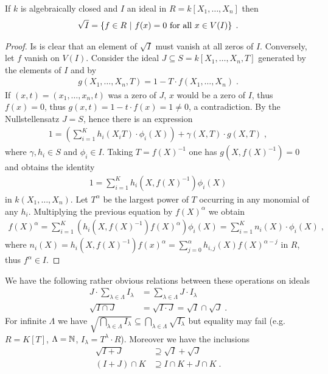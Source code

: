 \documentclass[a4paper,parskip=half,numbers=enddot, DIV=12]{scrreprt}
\begin{document}
	\begin{prop}
		If $k$ is algebraically closed and $I$ an ideal in $R=k[X_1,\ldots,X_n]$ then 
		\begin{align*}
			\sqrt{I} = \left\{f\in R\ \middle|\  f(x) = 0 \text{ for all } x\in V(I)\right\}\;.
		\end{align*}
	\end{prop}
	\begin{proof}
		Is is clear that an element of $\sqrt{I}$ must vanish at all zeros of $I$. Conversely, let $f$ vanish on $V(I)$. Consider the ideal $J\subseteq S = k[X_1,\ldots, X_n, T]$ generated by the elements of $I$ and by 
		\begin{align*}
		g(X_1,\ldots, X_n, T) = 1-T\cdot f(X_1,\ldots,X_n)\;. 
		\end{align*}
		If $(x,t) = (x_1,\ldots,x_n,t)$ was a zero of $J$, $x$ would be a zero of $I$, thus $f(x)=0$, thus $g(x,t) = 1-t\cdot f(x) = 1\neq 0$, a contradiction. By the Nullstellensatz $J=S$, hence there is an expression
		\begin{align*}
		1 = \left(\sum_{i=1}^K h_i(X_iT)\cdot \phi_i(X)\right) +
		\gamma (X,T) \cdot g(X,T)\;,
		\end{align*}
		where $\gamma,h_i\in S$ and $\phi_i\in I$. Taking $T=f(X)^{-1}$ one has $g(X,f(X)^{-1}) = 0$ and obtains the identity
		\begin{align*}
		1 = \sum_{i=1}^K h_i(X,f(X)^{-1})\phi_i(X)
		\end{align*}
		in $k(X_1,\ldots, X_n)$. Let $T^\alpha$ be the largest power of $T$ occurring in any monomial of any $h_i$. Multiplying the previous equation by $f(X)^\alpha$ we obtain
		\begin{align*}
		f(X)^\alpha = \sum_{i=1}^K \left(h_i\left(X,f(X)^{-1}\right) f(X)^\alpha\right) \phi_i(X) = \sum_{i=1}^K n_i(X) \cdot \phi_i(X)\;,
		\end{align*}
		where $n_i(X) = h_i\left(X,f(X)^{-1}\right)f(x)^\alpha = \sum_{j=0}^\alpha h_{i,j}(X) f(X)^{\alpha-j}$ in $R$, thus $f^\alpha\in I$.
	\end{proof}
	\begin{rem}
		We have the following rather obvious relations between these operations on ideals
		\begin{align}
		J \cdot \sum_{\lambda\in\Lambda} I_\lambda &= \sum_{\lambda\in \Lambda}J\cdot I_\lambda\\
		\sqrt{I\cap J}& = \sqrt{I\cdot J} = \sqrt{I}\cap \sqrt{J}\;.
		\end{align}
		For infinite $\Lambda$ we have $\sqrt{\bigcap_{\lambda\in\Lambda}I_\lambda} \subseteq \bigcap_{\lambda\in\Lambda} \sqrt{I_\lambda}$ but equality may fail (e.g. $R=K[T]$, $\Lambda = \mathbb{N}$, $I_\lambda = T^\lambda \cdot R$). Moreover we have the inclusions 
		\begin{align}
		\sqrt{I+J}&\supseteq \sqrt{I}+\sqrt{J}\\
		(I+J)\cap K &\supseteq I\cap K +J\cap K\;.
		\end{align}
		
	\end{rem}
	
\end{document}
